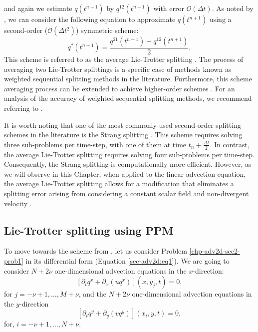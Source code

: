 and again we estimate $q(t^{n+1})$ by $q^{12}(t^{n+1})$ with error $\mathcal{O}(\Delta t)$.
As noted by \citet{strang:1968}, we can consider the following equation 
to approximate $q(t^{n+1})$ using a second-order ($\mathcal{O}(\Delta t^2)$) symmetric scheme:
\begin{equation}
	q^*(t^{n+1}) = \frac{q^{21}(t^{n+1}) + q^{12}(t^{n+1})}{2},
\end{equation}
This scheme is referred to as the average Lie-Trotter splitting \citep{holden:2010}.
The process of averaging two Lie-Trotter splittings is a specific case of methods
known as weighted sequential splitting methods in the literature.
Furthermore, this scheme averaging process can be extended to achieve higher-order schemes \citep{jia:2011}.
For an analysis of the accuracy of weighted sequential splitting methods, we recommend referring to \citet{csomos:2005}.


It is worth noting that one of the most commonly used second-order splitting schemes in the literature is the Strang splitting
\citep{strang:1968}.
This scheme requires solving three sub-problems per time-step, with one of them at time $t_n + \frac{\Delta t}{2}$.
In contrast, the average Lie-Trotter splitting requires solving four sub-problems per time-step.
Consequently, the Strang splitting is computationally more efficient.
However, as we will observe in this Chapter, when applied to the linear advection equation, 
the average Lie-Trotter splitting allows for a modification that eliminates a splitting error
arising from considering a constant scalar field and non-divergent velocity \citep{lin:1996}.

\subsection{Lie-Trotter splitting using PPM}
\label{lit-trotter-sp}
To move towards the scheme from \citet{lin:1996}, let us consider Problem \ref{chp-adv2d-sec2-prob1} in its differential form (Equation \eqref{sec-adv2d:eq1}).
We are going to consider $N+2\nu$ one-dimensional advection equations in the $x$-direction:
\begin{equation*}
	\label{chp-adv2d-adv2deq-xdir1}
	[{\partial_t q^x}+{\partial_x (uq^x)}](x, y_j, t)
	= 0,
\end{equation*}
for $j=-\nu+1, \ldots, M+\nu$,
and the $N+2\nu$ one-dimensional advection equations in the $y$-direction
\begin{equation*}
	\label{chp-adv2d-adv2deq-ydir1}
	[{\partial_t q^y} +{\partial_y (vq^y)}](x_i, y, t) = 0,
\end{equation*}
for, $i=-\nu+1, \ldots, N+\nu$.

